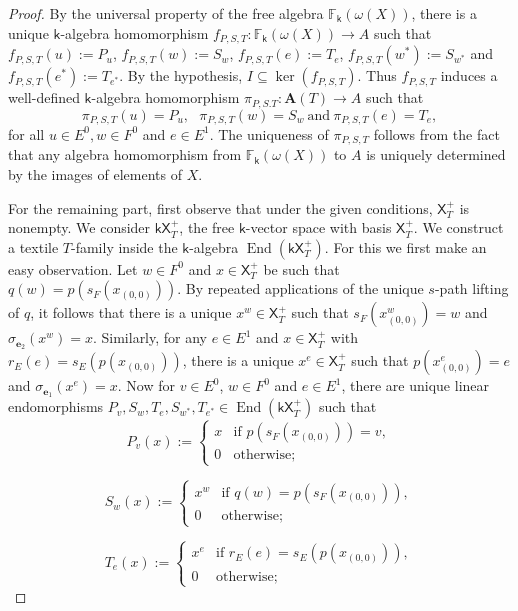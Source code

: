 \documentclass[a4paper,reqno,12pt]{amsart}
\theoremstyle{definition}
\theoremstyle{remark}
\newcommand{\End}{\operatorname{End}}
\begin{document}
\begin{proof}
By the universal property of the free algebra $\mathbb{F}_\mathsf{k}(\omega(X))$, there is a unique $\mathsf{k}$-algebra homomorphism $f_{P,S,T}:\mathbb{F}_\mathsf{k}(\omega(X))\longrightarrow A$ such that $f_{P,S,T}(u):=P_u$, $f_{P,S,T}(w):=S_w$, $f_{P,S,T}(e):=T_e$, $f_{P,S,T}(w^*):=S_{w^*}$ and $f_{P,S,T}(e^*):=T_{e^*}$. By the hypothesis, $I\subseteq \ker(f_{P,S,T})$. Thus $f_{P,S,T}$ induces a well-defined $\mathsf{k}$-algebra homomorphism $\pi_{P,S.T}:\mathbf{A}(T)\longrightarrow A$ such that \[\pi_{P,S,T}(u)=P_u,~~~\pi_{P,S,T}(w)=S_w~\text{and}~\pi_{P,S,T}(e)=T_e,\] for all $u\in E^0,w\in F^0$ and $e\in E^1$. The uniqueness of $\pi_{P,S,T}$ follows from the fact that any algebra homomorphism from $\mathbb{F}_\mathsf{k}(\omega(X))$ to $A$ is uniquely determined by the images of elements of $X$. 

For the remaining part, first observe that under the given conditions, $\mathsf{X}_T^+$ is nonempty. We consider $\mathsf{k}\mathsf{X}_T^+$, the free $\mathsf{k}$-vector space with basis $\mathsf{X}_T^+$. We construct a textile $T$-family inside the $\mathsf{k}$-algebra $\End(\mathsf{k}\mathsf{X}_T^+)$. For this we first make an easy observation. Let $w\in F^0$ and $x\in \mathsf{X}_T^+$ be such that $q(w)=p(s_F(x_{(0,0)}))$. By repeated applications of the unique $s$-path lifting of $q$, it follows that there is a unique $x^w\in \mathsf{X}_T^+$ such that $s_F(x^w_{(0,0)})=w$ and $\sigma_{\mathbf{e}_2}(x^w)=x$. Similarly, for any $e\in E^1$ and $x\in \mathsf{X}_T^+$ with $r_E(e)=s_E(p(x_{(0,0)}))$, there is a unique $x^e\in \mathsf{X}_T^+$ such that $p(x^e_{(0,0)})=e$ and $\sigma_{\mathbf{e}_1}(x^e)=x$. Now for $v\in E^0$, $w\in F^0$ and $e\in E^1$, there are unique linear endomorphisms $P_v,S_w,T_e,S_{w^*},T_{e^*}\in \End(\mathsf{k}\mathsf{X}_T^+)$ such that 
$$P_v(x):=
	\left\{
	\begin{array}{ll}
		x  & \mbox{if } p(s_F(x_{(0,0)}))=v, \\
		0 & \mbox{otherwise};
	\end{array}
	\right.$$

$$S_w(x):=
	\left\{
	\begin{array}{ll}
		x^w  & \mbox{if } q(w)=p(s_F(x_{(0,0)})), \\
		0 & \mbox{otherwise};
	\end{array}
	\right.$$

$$T_e(x):=
	\left\{
	\begin{array}{ll}
		x^e  & \mbox{if } r_E(e)=s_E(p(x_{(0,0)})), \\
		0 & \mbox{otherwise};
	\end{array}
	\right.$$


\end{proof}
\end{document}
